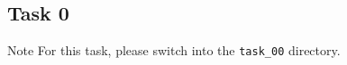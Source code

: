 \subsection{Task 0}
\begin{note}{Note}
For this task, please switch into the \texttt{task\_00} directory.
\end{note}
\blindtext{}
